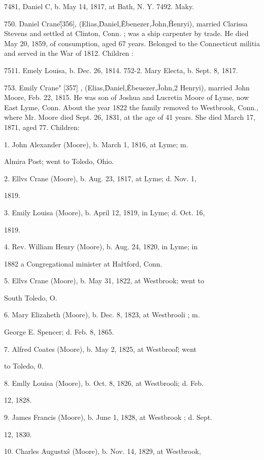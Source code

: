 \documentclass{book}
\begin{document}
7481, Daniel C, b. May 14, 1817, at Bath, N. Y. 
7492. Maky. 

750. Daniel Crane\^ [356], (Elias,\^ Daniel,\^ Ebenezer,\^ 
John,\^ Henryi), married Clarissa Stevens and settled at Clinton, 
Conn. ; was a ship carpenter by trade. He died May 20, 1859, 
of consumption, aged 67 years. Belonged to the Connecticut 
militia and served in the War of 1812. Children : 

7511. Emely Louisa, b. Dec. 26, 1814. 
752-2. Mary Electa, b. Sept. 8, 1817. 

753. Emily Crane" [357] , (Elias,\^ Daniel,\^ Ebeuezer,\^ John,2 
Henryi), married John Moore, Feb. 22, 1815. He was son of 
Joshua and Lucretia Moore of Lyme, now East Lyme, Conn. 
About the year 1822 the family removed to Westbrook, Conn., 
where Mr. Moore died Sept. 26, 1831, at the age of 41 years. 
She died March 17, 1871, aged 77. Children: 

1. John Alexander (Moore), b. March 1, 1816, at Lyme; m. 

Almira Post; went to Toledo, Ohio. 

2. Ellvs Crane (Moore), b. Aug. 23, 1817, at Lyme; d. Nov. 1, 

1819. 

3. Emily Louisa (Moore), b. April 12, 1819, in Lyme; d. Oct. 16, 

1819. 

4. Rev. William Henry (Moore), b. Aug. 24, 1820, in Lyme; in 

1882 a Congregational minister at Ha\^rtford, Conn. 

5. Ellvs Crane (Moore), b. May 31, 1822, at Westbrook; went to 

South Toledo, O. 

6. Mary Elizaheth (Moore), b. Dec. 8, 1823, at Westbrooli ; m. 

George E. Spencer; d. Feb. 8, 1865. 

7. Alfred Coates (Moore), b. May 2, 1825, at Westbrool\^; went 

to Toledo, 0. 

8. Emlly Louisa (Moore), b. Oct. 8, 1826, at Westbrooli; d. Feb. 

12, 1828. 

9. James Francis (Moore), b. June 1, 1828, at Westbrook ; d. Sept. 

12, 1830. 




10. Charles Augustx\^s (Moore), b. Nov. 14, 1829, at Westbrook, 
\end{document}

